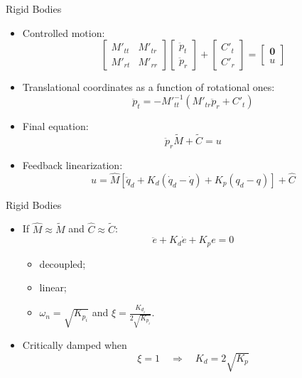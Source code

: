 \begin{frame}{Rigid Bodies}
  \begin{itemize}
    \item Controlled motion:
    \begin{equation}
      \begin{bmatrix}
        M'_{tt}&M'_{tr}\\
        M'_{rt}&M'_{rr}
      \end{bmatrix}
      \begin{bmatrix}
        \ddot{p}_t\\
        \ddot{p}_r
      \end{bmatrix}+\begin{bmatrix}
        C'_{t}\\
        C'_{r}
      \end{bmatrix}=\begin{bmatrix}
        \textbf{0}\\
          u
        \end{bmatrix}
    \end{equation}
    \item Translational coordinates as a function of rotational ones:
    \begin{equation}
      \ddot{p}_t=-{M'}_{tt}^{-1}(M'_{tr}\ddot{p}_r+C'_t)
    \end{equation}
    \item Final equation:
    \begin{equation}
      \ddot{p}_r\tilde{M}+\tilde{C}=u
    \end{equation}
    \item Feedback linearization:
    \begin{equation}
      u=\hat{M}[\ddot{q}_d+K_d(\dot{q}_d-\dot{q})+K_p(q_d-q)]+\hat{C}
    \end{equation}
  \end{itemize}
\end{frame}

\begin{frame}{Rigid Bodies}
  \begin{itemize}
    \item If $\hat{M}\approx \tilde{M}$ and $\hat{C}\approx\tilde{C}$:
    \begin{equation}
      \ddot{e}+K_d\dot{e}+K_pe=0
    \end{equation}
    \begin{itemize}
      \item decoupled;
      \item linear;
      \item $\omega_n=\sqrt{K_{p_i}}$ and $\xi=\frac{K_{d_i}}{2\sqrt{K_{p_i}}}$.
    \end{itemize}
    \item Critically damped when
    \begin{equation}
     \xi=1 \quad \Rightarrow \quad K_d=2\sqrt{K_p}
    \end{equation}
  \end{itemize}
\end{frame}

